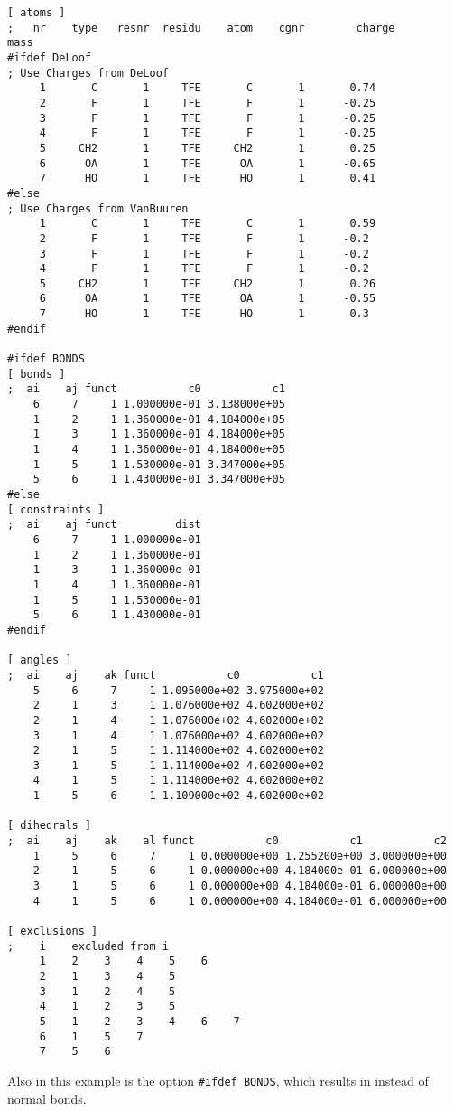 {\small\begin{verbatim}
[ atoms ]
;   nr    type   resnr  residu    atom    cgnr        charge          mass
#ifdef DeLoof
; Use Charges from DeLoof
     1       C       1     TFE       C       1		 0.74
     2       F       1     TFE       F       1		-0.25
     3       F       1     TFE       F       1		-0.25
     4       F       1     TFE       F       1		-0.25
     5     CH2       1     TFE     CH2       1		 0.25
     6      OA       1     TFE      OA       1		-0.65
     7      HO       1     TFE      HO       1		 0.41
#else
; Use Charges from VanBuuren
     1       C       1     TFE       C       1		 0.59
     2       F       1     TFE       F       1		-0.2
     3       F       1     TFE       F       1		-0.2
     4       F       1     TFE       F       1		-0.2
     5     CH2       1     TFE     CH2       1		 0.26
     6      OA       1     TFE      OA       1		-0.55
     7      HO       1     TFE      HO       1		 0.3
#endif

#ifdef BONDS
[ bonds ]
;  ai    aj funct           c0           c1
    6     7     1 1.000000e-01 3.138000e+05 
    1     2     1 1.360000e-01 4.184000e+05 
    1     3     1 1.360000e-01 4.184000e+05 
    1     4     1 1.360000e-01 4.184000e+05 
    1     5     1 1.530000e-01 3.347000e+05 
    5     6     1 1.430000e-01 3.347000e+05 
#else
[ constraints ]
;  ai    aj funct         dist
    6     7     1 1.000000e-01
    1     2     1 1.360000e-01
    1     3     1 1.360000e-01
    1     4     1 1.360000e-01
    1     5     1 1.530000e-01
    5     6     1 1.430000e-01
#endif

[ angles ]
;  ai    aj    ak funct           c0           c1
    5     6     7     1 1.095000e+02 3.975000e+02 
    2     1     3     1 1.076000e+02 4.602000e+02 
    2     1     4     1 1.076000e+02 4.602000e+02 
    3     1     4     1 1.076000e+02 4.602000e+02 
    2     1     5     1 1.114000e+02 4.602000e+02 
    3     1     5     1 1.114000e+02 4.602000e+02 
    4     1     5     1 1.114000e+02 4.602000e+02 
    1     5     6     1 1.109000e+02 4.602000e+02 

[ dihedrals ]
;  ai    aj    ak    al funct           c0           c1           c2
    1     5     6     7     1 0.000000e+00 1.255200e+00 3.000000e+00 
    2     1     5     6     1 0.000000e+00 4.184000e-01 6.000000e+00 
    3     1     5     6     1 0.000000e+00 4.184000e-01 6.000000e+00 
    4     1     5     6     1 0.000000e+00 4.184000e-01 6.000000e+00 

[ exclusions ]
;    i    excluded from i
     1    2    3    4    5    6
     2    1    3    4    5
     3    1    2    4    5
     4    1    2    3    5
     5    1    2    3    4    6    7
     6    1    5    7
     7    5    6
\end{verbatim}
}
Also in this example is the option {\tt \#ifdef BONDS}, which results
in  instead of normal bonds.

